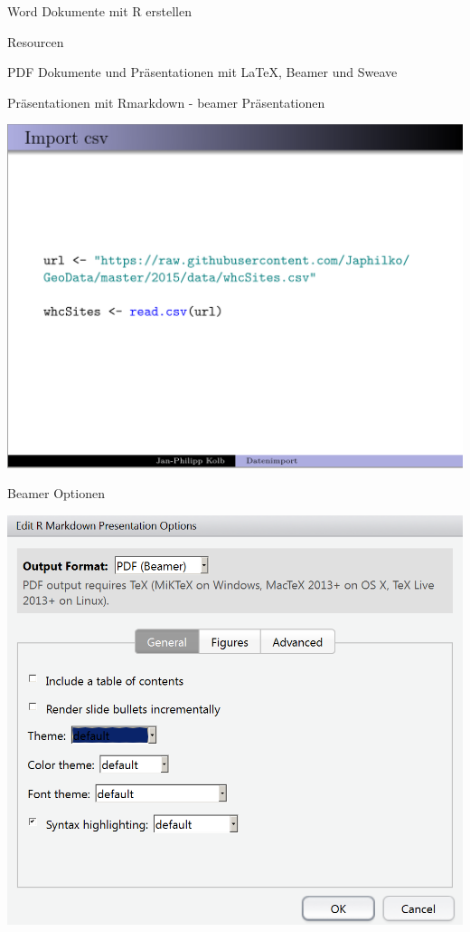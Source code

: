 \documentclass[ignorenonframetext,]{beamer}
\begin{document}
\begin{frame}[fragile]{Word Dokumente mit R erstellen}
\begin{block}{Resourcen}
\end{block}

\end{frame}

\begin{frame}[fragile]{PDF Dokumente und Präsentationen mit LaTeX,
Beamer und Sweave}

\begin{block}{Präsentationen mit Rmarkdown - beamer Präsentationen}

\includegraphics{./tex2pdf.9796/43e54ee751ab1c73b60a2b869af071d1e4aea5d5.png}

\end{block}

\begin{block}{Beamer Optionen}

\includegraphics{./tex2pdf.9796/55b0e29739cdff708c7f3c907c10eac9ce2400d4.png}


\end{block}
\end{frame}
\end{document}
